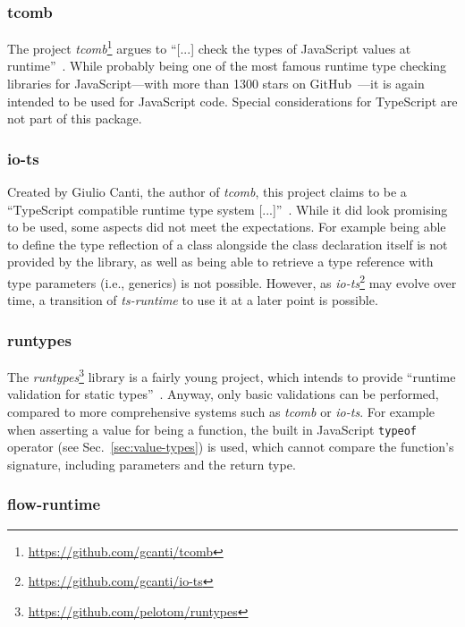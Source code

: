 \subsubsection{tcomb}

The project \emph{tcomb}\footnote{\url{https://github.com/gcanti/tcomb}} argues to ``[...] check the types of JavaScript values at runtime''~\cite{RuntimeTypeSystem:tcomb}. While probably being one of the most famous runtime type checking libraries for JavaScript---with more than 1300 stars on GitHub~\cite{RuntimeTypeSystem:tcomb}---it is again intended to be used for JavaScript code. Special considerations for TypeScript are not part of this package.

\subsubsection{io-ts}

Created by Giulio Canti, the author of \emph{tcomb}, this project claims to be a ``TypeScript compatible runtime type system [...]''~\cite{RuntimeTypeSystem:io-ts}. While it did look promising to be used, some aspects did not meet the expectations. For example being able to define the type reflection of a class alongside the class declaration itself is not provided by the library, as well as being able to retrieve a type reference with type parameters (i.e., generics) is not possible. However, as \emph{io-ts}\footnote{\url{https://github.com/gcanti/io-ts}} may evolve over time, a transition of \emph{ts-runtime} to use it at a later point is possible.

\subsubsection{runtypes}

The \emph{runtypes}\footnote{\url{https://github.com/pelotom/runtypes}} library is a fairly young project, which intends to provide ``runtime validation for static types''~\cite{RuntimeTypeSystem:runtypes}. Anyway, only basic validations can be performed, compared to more comprehensive systems such as \emph{tcomb} or \emph{io-ts}. For example when asserting a value for being a function, the built in JavaScript \texttt{typeof} operator (see Sec.~\ref{sec:value-types}) is used, which cannot compare the function's signature, including parameters and the return type.

\subsubsection{flow-runtime}

